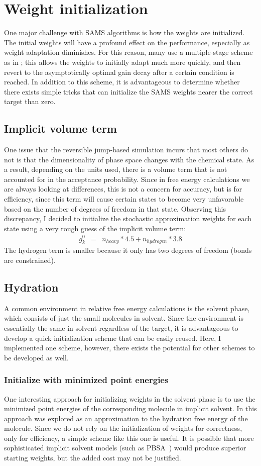 \section{Weight initialization}
%
One major challenge with SAMS algorithms is how the weights are initialized.
%
The initial weights will have a profound effect on the performance, especially as weight adaptation diminishes.
%
For this reason, many use a multiple-stage scheme as in \cite{Tan2017}; this allows the weights to initially adapt much more quickly, and then revert to the asymptotically optimal gain decay after a certain condition is reached.
%
In addition to this scheme, it is advantageous to determine whether there exists simple tricks that can initialize the SAMS weights nearer the correct target than zero.
%
\subsection{Implicit volume term}
%
One issue that the reversible jump-based simulation incurs that most others do not is that the dimensionality of phase space changes with the chemical state.
%
As a result, depending on the units used, there is a volume term that is not accounted for in the acceptance probability.
%
Since in free energy calculations we are always looking at differences, this is not a concern for accuracy, but is for efficiency, since this term will cause certain states to become very unfavorable based on the number of degrees of freedom in that state.
%
Observing this discrepancy, I decided to initialize the stochastic approximation weights for each state using a very rough guess of the implicit volume term: 
%
\begin{eqnarray}
g_k^0 &=& n_{heavy}*4.5 + n_{hydrogen}*3.8
\end{eqnarray}
%
The hydrogen term is smaller because it only has two degrees of freedom (bonds are constrained).
%
\subsection{Hydration}
%
A common environment in relative free energy calculations is the solvent phase, which consists of just the small molecules in solvent.
%
Since the environment is essentially the same in solvent regardless of the target, it is advantageous to develop a quick initialization scheme that can be easily reused.
%
Here, I implemented one scheme, however, there exists the potential for other schemes to be developed as well.
%
\subsubsection{Initialize with minimized point energies}
%
One interesting approach for initializing weights in the solvent phase is to use the minimized point energies of the corresponding molecule in implicit solvent.
%
In \cite{mobley2008} this approach was explored as an approximation to the hydration free energy of the molecule.
%
Since we do not rely on the initialization of weights for correctness, only for efficiency, a simple scheme like this one is useful.
%
It is possible that more sophisticated implicit solvent models (such as PBSA~\cite{Tan2006}) would produce superior starting weights, but the added cost may not be justified.
%
%
